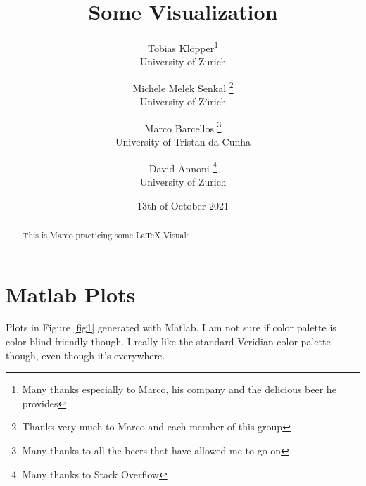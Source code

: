 \documentclass{article}
\begin{document}
\title{Some Visualization}
\author{Tobias Klöpper\thanks{Many thanks especially to Marco, his company and the delicious beer he provides}\\
\normalsize University of Zurich
\and Michele Melek Senkal \thanks{Thanks very much to Marco and each member of this group}\\
\normalsize University of Zürich
\and Marco Barcellos \thanks{Many thanks to all the beers that have allowed me to go on}\\
\normalsize University of Tristan da Cunha
\and David Annoni \thanks{Many thanks to Stack Overflow}\\
\normalsize University of Zurich}
\date{13th of October 2021}
\maketitle
\begin{abstract}
This is Marco practicing some LaTeX Visuals.
\end{abstract}

\newpage
\section{Matlab Plots}
Plots in Figure \ref{fig1} generated with Matlab. I am not sure if color palette is color blind friendly though. I really like the standard Veridian color palette though, even though it's everywhere.
\end{document}
